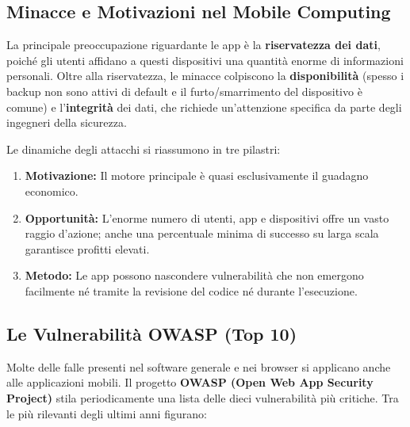 \documentclass{article}
\begin{document}
\vspace{0.5cm}

\subsection*{Minacce e Motivazioni nel Mobile Computing}

La principale preoccupazione riguardante le app è la \textbf{riservatezza dei dati}, poiché gli utenti affidano a questi dispositivi una quantità enorme di informazioni personali. Oltre alla riservatezza, le minacce colpiscono la \textbf{disponibilità} (spesso i backup non sono attivi di default e il furto/smarrimento del dispositivo è comune) e l'\textbf{integrità} dei dati, che richiede un'attenzione specifica da parte degli ingegneri della sicurezza.

Le dinamiche degli attacchi si riassumono in tre pilastri:

\begin{enumerate}
    \item \textbf{Motivazione:} Il motore principale è quasi esclusivamente il guadagno economico.
    \item \textbf{Opportunità:} L'enorme numero di utenti, app e dispositivi offre un vasto raggio d'azione; anche una percentuale minima di successo su larga scala garantisce profitti elevati.
    \item \textbf{Metodo:} Le app possono nascondere vulnerabilità che non emergono facilmente né tramite la revisione del codice né durante l'esecuzione.
\end{enumerate}

\vspace{0.5cm}

\subsection*{Le Vulnerabilità OWASP (Top 10)}

    Molte delle falle presenti nel software generale e nei browser si applicano anche alle applicazioni mobili. Il progetto \textbf{OWASP (Open Web App Security Project)} stila periodicamente una lista delle dieci vulnerabilità più critiche. Tra le più rilevanti degli ultimi anni figurano:

    \vspace{0.5cm}
\end{document}
